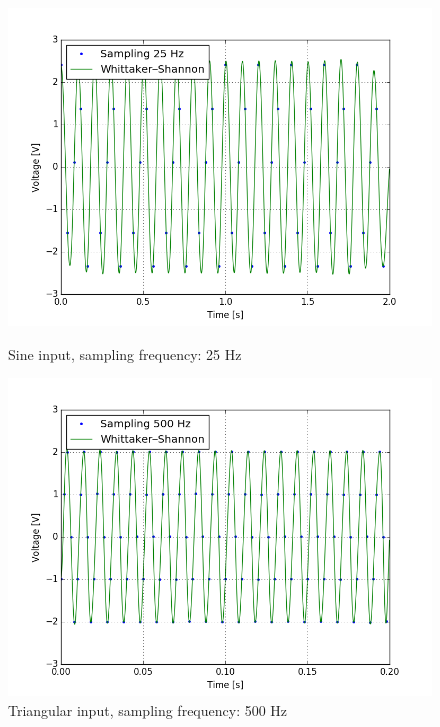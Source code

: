 \begin{figure}[H]
\centering
\begin{minipage}{.5\textwidth}
  \centering
\includegraphics[width=\textwidth]{13/25Hz.png}
\caption{Sine input, sampling frequency: 25 Hz}
\end{minipage}%
\begin{minipage}{.5\textwidth}
  \centering
\includegraphics[width=\textwidth]{13/500Hz.png}
\caption{Triangular input, sampling frequency: 500 Hz}
\end{minipage}
\end{figure}
